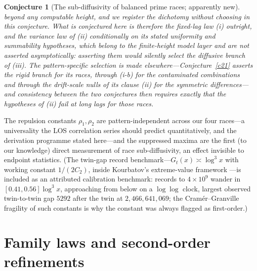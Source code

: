 \documentclass[11pt]{article}
\newtheorem{conjecture}{Conjecture}
\theoremstyle{definition}
\begin{document}
\begin{conjecture}[The sub-diffusivity of balanced prime races;
apparently new]
beyond any computable height, and we register the dichotomy without
choosing \emph{in this conjecture}.  What is conjectured here is
therefore the fixed-lag law (i) outright, and the variance law of
(ii) \emph{conditionally on} its stated uniformity and summability
hypotheses, which belong to the finite-height model layer and are
not asserted asymptotically: asserting them would silently select
the diffusive branch of (iii).  The pattern-specific selection is made elsewhere---Conjecture~\ref{c21} asserts the rigid branch for its races, through (i-b) for the contaminated combinations and through the drift-scale nulls of its clause (ii) for the symmetric differences---and consistency between the two
conjectures then requires exactly that the hypotheses of (ii) fail
at long lags for those races.
\end{conjecture}

The repulsion constants
$\rho_1,\rho_2$ are pattern-independent across our four races---a
universality the LOS correlation series should predict
quantitatively, and the derivation programme stated here---and the
suppressed maxima are the first (to our knowledge) direct measurement
of race sub-diffusivity, an effect invisible to endpoint statistics.
(The twin-gap record benchmark---$G_t(x)\asymp\log^3x$
with working constant $1/(2C_2)$, inside Kourbatov's
extreme-value framework \cite{Kourbatov}---is included as an
attributed calibration benchmark: records to $4\times10^9$ wander in
$[0.41,0.56]\log^3x$, approaching from below on a $\log\log$ clock,
largest observed twin-to-twin gap $5292$ after the twin at
$2{,}466{,}641{,}069$; the Cram\'er--Granville fragility of such
constants \cite{Granville} is why the constant was always flagged as
first-order.)

\section{Family laws and second-order refinements}
\end{document}
